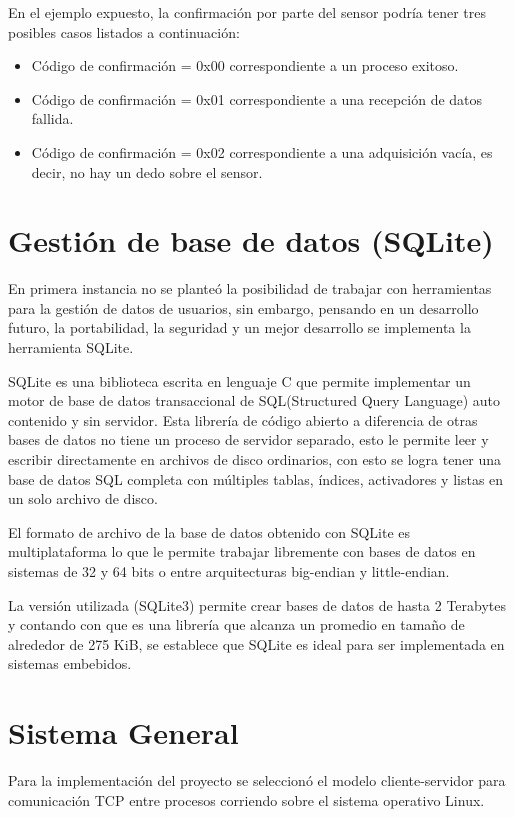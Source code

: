En el ejemplo expuesto, la confirmación por parte del sensor podría tener tres posibles casos listados a continuación:

\begin{itemize}
\item Código de confirmación = 0x00 correspondiente a un proceso exitoso. 
\item Código de confirmación = 0x01 correspondiente a una recepción de datos fallida. 
\item Código de confirmación = 0x02 correspondiente a una adquisición vacía, es decir, no hay un dedo sobre el sensor.
\end{itemize}

\section{Gestión de base de datos (SQLite)}
En primera instancia no se planteó la posibilidad de trabajar con herramientas para la gestión de datos de usuarios, sin embargo, pensando en un desarrollo futuro, la portabilidad, la seguridad y un mejor desarrollo se implementa la herramienta SQLite.

SQLite es una biblioteca escrita en lenguaje C que permite implementar un motor de base de datos transaccional de SQL(Structured Query Language) auto contenido y sin servidor. Esta librería de código abierto a diferencia de otras bases de datos no tiene un proceso de servidor separado, esto le permite leer y escribir directamente en archivos de disco ordinarios, con esto se logra tener una base de datos SQL  completa con múltiples tablas, índices, activadores y listas en un solo archivo de disco.

El formato de archivo de la base de datos obtenido con SQLite es multiplataforma lo que le permite trabajar libremente con bases de datos en sistemas de 32 y 64 bits o entre arquitecturas big-endian y little-endian. 

La versión utilizada (SQLite3) permite crear bases de  datos de hasta 2 Terabytes y contando con que es una librería que alcanza un promedio en tamaño de alrededor de 275 KiB, se establece que SQLite es ideal para ser implementada en sistemas embebidos.
\section{Sistema General}
Para la implementación del proyecto se seleccionó el modelo cliente-servidor para comunicación TCP entre procesos corriendo sobre el sistema operativo Linux.

